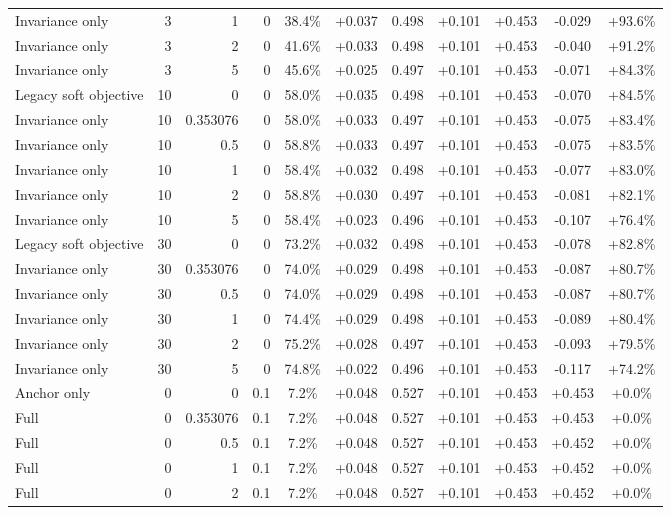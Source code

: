 \begin{table}[htbp]
\begin{tabular}{lrrrccccccc}
Invariance only & 3 & 1 & 0 & 38.4\% & +0.037 & 0.498 & +0.101 & +0.453 & -0.029 & +93.6\% \\
Invariance only & 3 & 2 & 0 & 41.6\% & +0.033 & 0.498 & +0.101 & +0.453 & -0.040 & +91.2\% \\
Invariance only & 3 & 5 & 0 & 45.6\% & +0.025 & 0.497 & +0.101 & +0.453 & -0.071 & +84.3\% \\
Legacy soft objective & 10 & 0 & 0 & 58.0\% & +0.035 & 0.498 & +0.101 & +0.453 & -0.070 & +84.5\% \\
Invariance only & 10 & 0.353076 & 0 & 58.0\% & +0.033 & 0.497 & +0.101 & +0.453 & -0.075 & +83.4\% \\
Invariance only & 10 & 0.5 & 0 & 58.8\% & +0.033 & 0.497 & +0.101 & +0.453 & -0.075 & +83.5\% \\
Invariance only & 10 & 1 & 0 & 58.4\% & +0.032 & 0.498 & +0.101 & +0.453 & -0.077 & +83.0\% \\
Invariance only & 10 & 2 & 0 & 58.8\% & +0.030 & 0.497 & +0.101 & +0.453 & -0.081 & +82.1\% \\
Invariance only & 10 & 5 & 0 & 58.4\% & +0.023 & 0.496 & +0.101 & +0.453 & -0.107 & +76.4\% \\
Legacy soft objective & 30 & 0 & 0 & 73.2\% & +0.032 & 0.498 & +0.101 & +0.453 & -0.078 & +82.8\% \\
Invariance only & 30 & 0.353076 & 0 & 74.0\% & +0.029 & 0.498 & +0.101 & +0.453 & -0.087 & +80.7\% \\
Invariance only & 30 & 0.5 & 0 & 74.0\% & +0.029 & 0.498 & +0.101 & +0.453 & -0.087 & +80.7\% \\
Invariance only & 30 & 1 & 0 & 74.4\% & +0.029 & 0.498 & +0.101 & +0.453 & -0.089 & +80.4\% \\
Invariance only & 30 & 2 & 0 & 75.2\% & +0.028 & 0.497 & +0.101 & +0.453 & -0.093 & +79.5\% \\
Invariance only & 30 & 5 & 0 & 74.8\% & +0.022 & 0.496 & +0.101 & +0.453 & -0.117 & +74.2\% \\
Anchor only & 0 & 0 & 0.1 & 7.2\% & +0.048 & 0.527 & +0.101 & +0.453 & +0.453 & +0.0\% \\
Full & 0 & 0.353076 & 0.1 & 7.2\% & +0.048 & 0.527 & +0.101 & +0.453 & +0.453 & +0.0\% \\
Full & 0 & 0.5 & 0.1 & 7.2\% & +0.048 & 0.527 & +0.101 & +0.453 & +0.452 & +0.0\% \\
Full & 0 & 1 & 0.1 & 7.2\% & +0.048 & 0.527 & +0.101 & +0.453 & +0.452 & +0.0\% \\
Full & 0 & 2 & 0.1 & 7.2\% & +0.048 & 0.527 & +0.101 & +0.453 & +0.452 & +0.0\% \\

\end{tabular}
\end{table}
